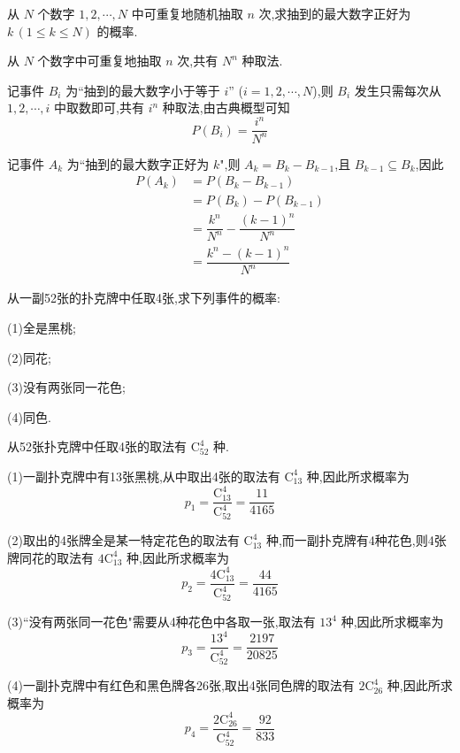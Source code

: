\question 从 $N$ 个数字 $1,2,\cdots,N$ 中可重复地随机抽取 $n$ 次,求抽到的最大数字正好为 $k \, (1 \leqslant k \leqslant N)$ 的概率.

\begin{solution}
    从 $N$ 个数字中可重复地抽取 $n$ 次,共有 $N^n$ 种取法.

    记事件 $B_i$ 为``抽到的最大数字小于等于 $i$'' ($i=1,2,\cdots,N$),则 $B_i$ 发生只需每次从 $1,2,\cdots,i$ 中取数即可,共有 $i^n$ 种取法,由古典概型可知
    $$
    P(B_i) = \dfrac{i^n}{N^n}
    $$

    记事件 $A_k$ 为``抽到的最大数字正好为 $k$",则 $A_k = B_k - B_{k-1}$,且 $B_{k-1} \subseteq B_k$,因此
    $$
    \begin{aligned}
        P(A_k) &= P(B_k - B_{k-1}) \\
        &= P(B_k) - P(B_{k-1}) \\
        &= \dfrac{k^n}{N^n} - \dfrac{(k-1)^n}{N^n} \\
        &= \dfrac{k^n - (k-1)^n}{N^n}
    \end{aligned}
    $$
\end{solution}

\question 从一副52张的扑克牌中任取4张,求下列事件的概率:

(1)全是黑桃;

(2)同花;

(3)没有两张同一花色;

(4)同色.

\begin{solution}
    从52张扑克牌中任取4张的取法有 $\mathrm{C}_{52}^4$ 种.

    (1)一副扑克牌中有13张黑桃,从中取出4张的取法有 $\mathrm{C}_{13}^4$ 种,因此所求概率为
    $$
    p_1 = \dfrac{\mathrm{C}_{13}^4}{\mathrm{C}_{52}^4} = \dfrac{11}{4165}
    $$

    (2)取出的4张牌全是某一特定花色的取法有 $\mathrm{C}_{13}^4$ 种,而一副扑克牌有4种花色,则4张牌同花的取法有 $4 \mathrm{C}_{13}^4$ 种,因此所求概率为
    $$
    p_2 = \dfrac{4 \mathrm{C}_{13}^4}{\mathrm{C}_{52}^4} = \dfrac{44}{4165}
    $$

    (3)``没有两张同一花色"需要从4种花色中各取一张,取法有 $13^4$ 种,因此所求概率为
    $$
    p_3 = \dfrac{13^4}{\mathrm{C}_{52}^4} = \dfrac{2197}{20825}
    $$

    (4)一副扑克牌中有红色和黑色牌各26张,取出4张同色牌的取法有 $2 \mathrm{C}_{26}^4$ 种,因此所求概率为
    $$
    p_4 = \dfrac{2 \mathrm{C}_{26}^4}{\mathrm{C}_{52}^4} = \dfrac{92}{833}
    $$
\end{solution}

